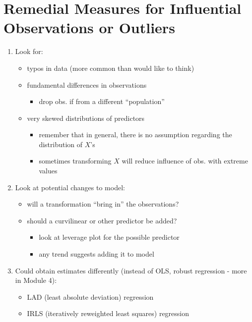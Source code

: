 \documentclass[12pt]{../notes}
\begin{document}
\section{Remedial Measures for Influential Observations or Outliers}

\begin{enumerate}
 \item Look for:
    \begin{itemize}
       \item  typos in data (more common than would like to think)
       \item fundamental differences in observations
          \begin{itemize}
            \item drop obs. if from a different ``population''
          \end{itemize}
       \item very skewed distributions of predictors
         \begin{itemize}
             \item remember that in general, there is no assumption regarding the distribution of $X$'s
             \item sometimes transforming $X$ will reduce influence of obs. with extreme values
         \end{itemize}
    \end{itemize}

 \item Look at potential changes to model:
  \begin{itemize}
    \item will a transformation ``bring in'' the observations?
    \item should a curvilinear or other predictor be added?
       \begin{itemize}
         \item look at leverage plot for the possible predictor
         \item any trend suggests adding it to model
       \end{itemize}
  \end{itemize}

 \item Could obtain estimates differently (instead of OLS, robust regression - more in Module 4):
     \begin{itemize}
        \item LAD (least absolute deviation) regression
        \item IRLS (iteratively reweighted least squares) regression
     \end{itemize}
\end{enumerate}








\end{document}
